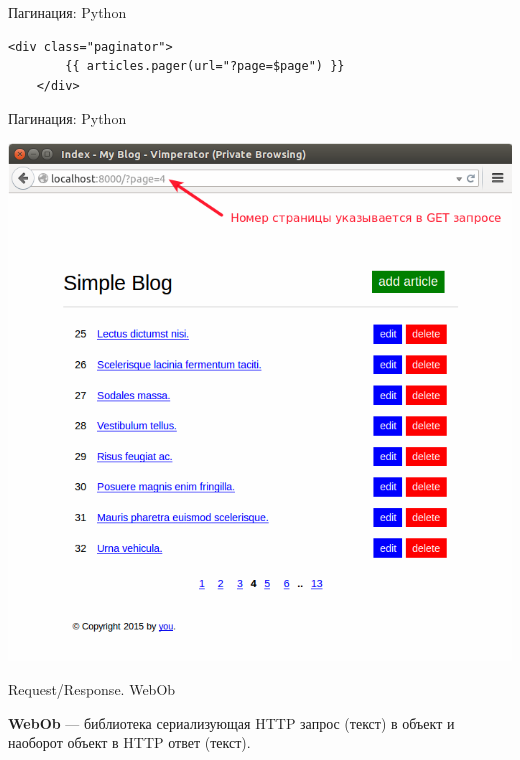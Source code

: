 \begin{frame}[fragile]{Пагинация: Python}

  \begin{lstlisting}[style=python]
    <div class="paginator">
        {{ articles.pager(url="?page=$page") }}
    </div>
  \end{lstlisting}

\end{frame}


\begin{frame}{Пагинация: Python}

  \begin{center}
    \includegraphics[height=\textheight]{media/blog_with_page.png}
  \end{center}

\end{frame}

\begin{frame}{Request/Response. WebOb}

  \textbf{WebOb} --- библиотека сериализующая HTTP запрос (текст) в объект и
  наоборот объект в HTTP ответ (текст).

\end{frame}

